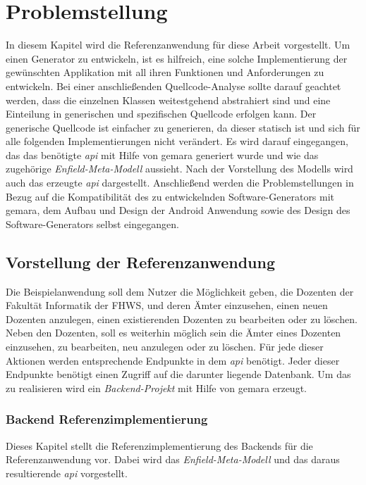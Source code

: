 \chapter{Problemstellung} \label{ch:problem}
In diesem Kapitel wird die Referenzanwendung für diese Arbeit vorgestellt. Um einen Generator zu entwickeln, ist es hilfreich, eine solche Implementierung der gewünschten Applikation mit all ihren Funktionen und Anforderungen zu entwickeln. Bei einer anschließenden Quellcode-Analyse sollte darauf geachtet werden, dass die einzelnen Klassen weitestgehend abstrahiert sind und eine Einteilung in generischen und spezifischen Quellcode erfolgen kann. Der generische Quellcode ist einfacher zu generieren, da dieser statisch ist und sich für alle folgenden Implementierungen nicht verändert. 
Es wird darauf eingegangen, das das benötigte \textit{\acf{api}} mit Hilfe von \acf{gemara} generiert wurde und wie das zugehörige \textit{Enfield-Meta-Modell} aussieht. Nach der Vorstellung des Modells wird auch das erzeugte \textit{\acf{api}} dargestellt. Anschließend werden die Problemstellungen in Bezug auf die Kompatibilität des zu entwickelnden Software-Generators mit \ac{gemara}, dem Aufbau und Design der Android Anwendung sowie des Design des Software-Generators selbst eingegangen.

\section{Vorstellung der Referenzanwendung}
Die Beispielanwendung soll dem Nutzer die Möglichkeit geben, die Dozenten der Fakultät Informatik der FHWS, und deren Ämter einzusehen, einen neuen Dozenten anzulegen, einen existierenden Dozenten zu bearbeiten oder zu löschen. Neben den Dozenten, soll es weiterhin möglich sein die Ämter eines Dozenten einzusehen, zu bearbeiten, neu anzulegen oder zu löschen. Für jede dieser Aktionen werden entsprechende Endpunkte in dem \textit{\acf{api}} benötigt. Jeder dieser Endpunkte benötigt einen Zugriff auf die darunter liegende Datenbank. Um das zu realisieren wird ein \textit{Backend-Projekt} mit Hilfe von \ac{gemara} erzeugt.

\subsection{Backend Referenzimplementierung}
Dieses Kapitel stellt die Referenzimplementierung des Backends für die Referenzanwendung vor. Dabei wird das \textit{Enfield-Meta-Modell} und das daraus resultierende \textit{\acf{api}} vorgestellt.

